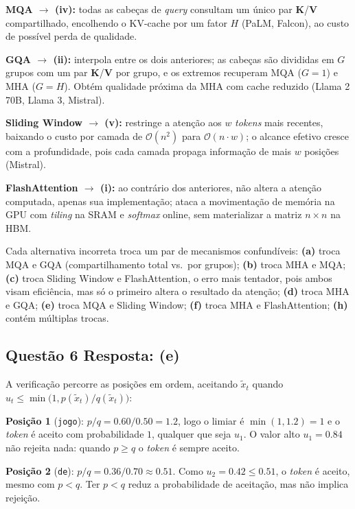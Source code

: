 \documentclass[11pt,a4paper]{article}
\begin{document}
\textbf{MQA $\to$ (iv):} todas as cabeças de \textit{query} consultam um único par $\mathbf{K}$/$\mathbf{V}$ compartilhado, encolhendo o KV-cache por um fator $H$ (PaLM, Falcon), ao custo de possível perda de qualidade.

\textbf{GQA $\to$ (ii):} interpola entre os dois anteriores; as cabeças são divididas em $G$ grupos com um par $\mathbf{K}$/$\mathbf{V}$ por grupo, e os extremos recuperam MQA ($G = 1$) e MHA ($G = H$). Obtém qualidade próxima da MHA com cache reduzido (Llama 2 70B, Llama 3, Mistral).

\textbf{Sliding Window $\to$ (v):} restringe a atenção aos $w$ \textit{tokens} mais recentes, baixando o custo por camada de $\mathcal{O}(n^2)$ para $\mathcal{O}(n \cdot w)$; o alcance efetivo cresce com a profundidade, pois cada camada propaga informação de mais $w$ posições (Mistral).

\textbf{FlashAttention $\to$ (i):} ao contrário dos anteriores, não altera a atenção computada, apenas sua implementação; ataca a movimentação de memória na GPU com \textit{tiling} na SRAM e \textit{softmax} online, sem materializar a matriz $n \times n$ na HBM.

Cada alternativa incorreta troca um par de mecanismos confundíveis: \textbf{(a)} troca MQA e GQA (compartilhamento total vs.\ por grupos); \textbf{(b)} troca MHA e MQA; \textbf{(c)} troca Sliding Window e FlashAttention, o erro mais tentador, pois ambos visam eficiência, mas só o primeiro altera o resultado da atenção; \textbf{(d)} troca MHA e GQA; \textbf{(e)} troca MQA e Sliding Window; \textbf{(f)} troca MHA e FlashAttention; \textbf{(h)} contém múltiplas trocas.

\subsection*{Questão 6 \textemdash{} Resposta: (e)}
A verificação percorre as posições em ordem, aceitando $\tilde{x}_t$ quando $u_t \le \min\bigl(1, p(\tilde{x}_t)/q(\tilde{x}_t)\bigr)$:

\textbf{Posição 1} (\texttt{jogo}): $p/q = 0.60/0.50 = 1.2$, logo o limiar é $\min(1, 1.2) = 1$ e o \textit{token} é aceito com probabilidade $1$, qualquer que seja $u_1$. O valor alto $u_1 = 0.84$ não rejeita nada: quando $p \ge q$ o \textit{token} é sempre aceito.

\textbf{Posição 2} (\texttt{de}): $p/q = 0.36/0.70 \approx 0.51$. Como $u_2 = 0.42 \le 0.51$, o \textit{token} é aceito, mesmo com $p < q$. Ter $p < q$ reduz a probabilidade de aceitação, mas não implica rejeição.
\end{document}
